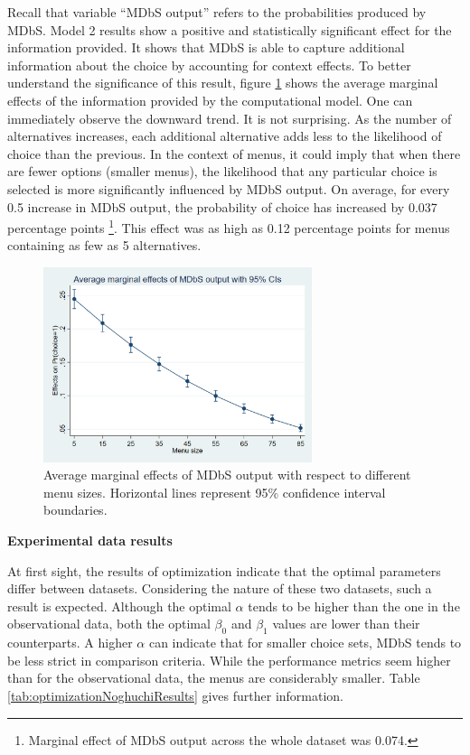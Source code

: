 \documentclass[a4paper,12pt]{article}
\begin{document}
Recall that variable ``MDbS output'' refers to the probabilities produced by MDbS. Model 2 results show a positive and statistically significant effect for the information provided. It shows that MDbS is able to capture additional information about the choice by accounting for context effects. To better understand the significance of this result, figure \ref{fig:marginsAmadeusGraph} shows the average marginal effects of the information provided by the computational model. One can immediately observe the downward trend. It is not surprising. As the number of alternatives increases, each additional alternative adds less to the likelihood of choice than the previous. In the context of menus, it could imply that when there are fewer options (smaller menus), the likelihood that any particular choice is selected is more significantly influenced by MDbS output. On average, for every 0.5 increase in MDbS output, the probability of choice has increased by 0.037 percentage points \footnote{Marginal effect of MDbS output across the whole dataset was 0.074.}. This effect was as high as 0.12 percentage points for menus containing as few as 5 alternatives. 

\begin{figure}[h]
    \centering
    \includegraphics[width=0.7\textwidth]{staticFiles/marginsAmadeusGraph.png}
    \caption[Marginal effects of MDbS output]{Average marginal effects of MDbS output with respect to different menu sizes. Horizontal lines represent 95\% confidence interval boundaries.} %
    \label{fig:marginsAmadeusGraph} %

\end{figure}

\textbf{Experimental data results}

At first sight, the results of optimization indicate that the optimal parameters differ between datasets. Considering the nature of these two datasets, such a result is expected. Although the optimal $\alpha$ tends to be higher than the one in the observational data, both the optimal $\beta_0$ and $\beta_1$ values are lower than their counterparts. A higher $\alpha$ can indicate that for smaller choice sets, MDbS tends to be less strict in comparison criteria. While the performance metrics seem higher than for the observational data, the menus are considerably smaller. Table \ref{tab:optimizationNoghuchiResults} gives further information.
\end{document}
